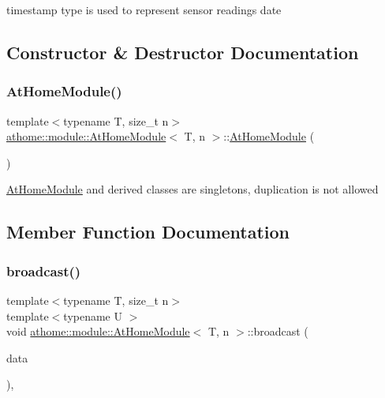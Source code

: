 {\ttfamily timestamp} type is used to represent sensor readings date 

\subsection{Constructor \& Destructor Documentation}
\mbox{\label{classathome_1_1module_1_1_at_home_module_ad78045943a579874ec16e14cf976eada}} 
\subsubsection{\texorpdfstring{At\+Home\+Module()}{AtHomeModule()}}
{\footnotesize\ttfamily template$<$typename T, size\+\_\+t n$>$ \\
\mbox{\hyperlink{classathome_1_1module_1_1_at_home_module}{athome\+::module\+::\+At\+Home\+Module}}$<$ T, n $>$\+::\mbox{\hyperlink{classathome_1_1module_1_1_at_home_module}{At\+Home\+Module}} (\begin{DoxyParamCaption}\item[{const \mbox{\hyperlink{classathome_1_1module_1_1_at_home_module}{At\+Home\+Module}}$<$ T, n $>$ \&}]{ }\end{DoxyParamCaption})\hspace{0.3cm}{\ttfamily [delete]}}

\mbox{\hyperlink{classathome_1_1module_1_1_at_home_module}{At\+Home\+Module}} and derived classes are singletons, duplication is not allowed 

\subsection{Member Function Documentation}
\mbox{\label{classathome_1_1module_1_1_at_home_module_a22f6afbe9594849ecccae5b9f4dfe47d}} 
\subsubsection{\texorpdfstring{broadcast()}{broadcast()}}
{\footnotesize\ttfamily template$<$typename T, size\+\_\+t n$>$ \\
template$<$typename U $>$ \\
void \mbox{\hyperlink{classathome_1_1module_1_1_at_home_module}{athome\+::module\+::\+At\+Home\+Module}}$<$ T, n $>$\+::broadcast (\begin{DoxyParamCaption}\item[{const U \&}]{data }\end{DoxyParamCaption})\hspace{0.3cm}{\ttfamily [inline]}, {\ttfamily [protected]}}

